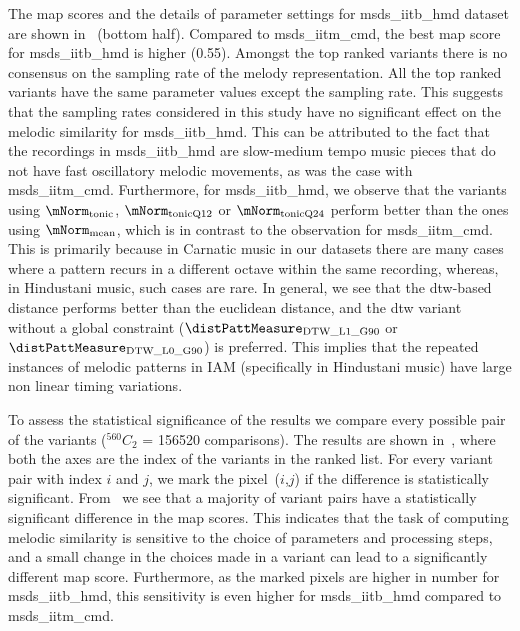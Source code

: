The \gls{map} scores and the details of parameter settings for \acrshort{msds_iitb_hmd} dataset are shown in~ (bottom half). Compared to \acrshort{msds_iitm_cmd}, the best \gls{map} score for \acrshort{msds_iitb_hmd} is higher (0.55). Amongst the top ranked variants there is no consensus on the sampling rate of the melody representation. All the top ranked variants have the same parameter values except the sampling rate. This suggests that the sampling rates considered in this study have no significant effect on the melodic similarity for \acrshort{msds_iitb_hmd}. This can be attributed to the fact that the recordings in \acrshort{msds_iitb_hmd} are slow-medium tempo music pieces that do not have fast oscillatory melodic movements, as was the case with \acrshort{msds_iitm_cmd}.  Furthermore, for \acrshort{msds_iitb_hmd}, we observe that the variants using $\mNorm_{\mathrm{tonic}}$, $\mNorm_{\mathrm{tonicQ12}}$ or $\mNorm_{\mathrm{tonicQ24}}$ perform better than the ones using $\mNorm_{\mathrm{mean}}$, which is in contrast to the observation for \acrshort{msds_iitm_cmd}. This is primarily because in Carnatic music in our datasets there are many cases where a pattern recurs in a different octave within the same recording, whereas, in Hindustani music, such cases are rare. In general, we see that the \gls{dtw}-based distance performs better than the euclidean distance, and the \gls{dtw} variant without a global constraint ($\distPattMeasure_{\mathrm{DTW\_L1\_G90}}$ or $\distPattMeasure_{\mathrm{DTW\_L0\_G90}}$) is preferred. This implies that the repeated instances of melodic patterns in IAM (specifically in Hindustani music) have large non linear timing variations.

To assess the statistical significance of the results we compare every possible pair of the variants ($^{560}C_{2}$ = 156520 comparisons). The results are shown in~, where both the axes are the index of the variants in the ranked list. For every variant pair with index $i$ and $j$, we mark the pixel~($i$,$j$) if the difference is statistically significant. From~ we see that a majority of variant pairs have a statistically significant difference in the \gls{map} scores. This indicates that the task of computing melodic similarity is sensitive to the choice of parameters and processing steps, and a small change in the choices made in a variant can lead to a significantly different \gls{map} score. Furthermore, as the marked pixels are higher in number for \acrshort{msds_iitb_hmd}, this sensitivity is even higher for \acrshort{msds_iitb_hmd} compared to \acrshort{msds_iitm_cmd}.


